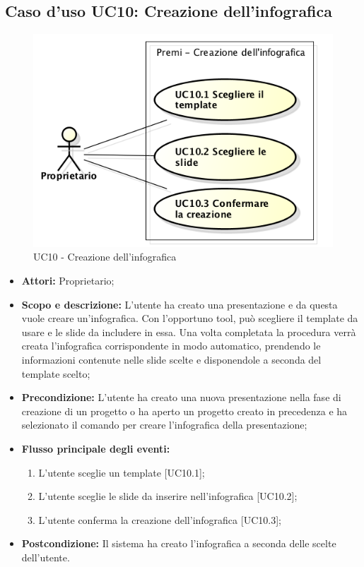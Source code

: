 \subsection{Caso d'uso UC10: Creazione dell'infografica}
\begin{figure}[h] 
	\centering 
	\includegraphics[scale=0.45] {img/UC10.png}
	\caption{UC10 - Creazione dell'infografica}
\end{figure}

\begin{itemize}
	\item \textbf{Attori:} Proprietario;
	\item \textbf{Scopo e descrizione:} L'utente ha creato una presentazione e da questa vuole creare un'\gls{infografica}. Con l'opportuno tool, può scegliere il \gls{template} da usare e le \gls{slide} da includere in essa. Una volta completata la procedura verrà creata l'\gls{infografica} corrispondente in modo automatico, prendendo le informazioni contenute nelle slide scelte e disponendole a seconda del template scelto;
	\item \textbf{Precondizione:} L'utente ha creato una nuova presentazione nella fase di creazione di un progetto o ha aperto un progetto creato in precedenza e ha selezionato il comando per creare l'\gls{infografica} della presentazione;
	
	\item \textbf{Flusso principale degli eventi:}
	\begin{enumerate}
		\item L'utente sceglie un \gls{template} [UC10.1];
		\item L'utente sceglie le \gls{slide} da inserire nell'\gls{infografica} [UC10.2];
		\item L'utente conferma la creazione dell'\gls{infografica} [UC10.3];
	\end{enumerate}
	\item \textbf{Postcondizione:} Il sistema ha creato l'\gls{infografica} a seconda delle scelte dell'utente.
\end{itemize}


